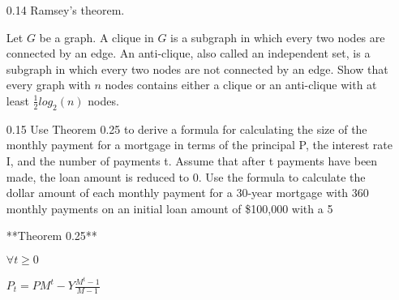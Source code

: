 \documentclass[12pt, a4paper]{article}
\begin{document}
\begin{enumerate}
\item[0.14]
Ramsey's theorem. 

Let $G$ be a graph. A clique in $G$ is a subgraph in which every two nodes are connected by an edge. An anti-clique, also called an independent set, is a subgraph in which every two nodes are not connected by an edge. Show that every graph with $n$ nodes contains either a clique or an anti-clique with at least $\frac{1}{2} log_2(n)$ nodes.


\item[0.15]
Use Theorem 0.25 to derive a formula for calculating the size of the monthly payment for a mortgage in terms of the principal P, the interest rate I, and the number of payments t. Assume that after t payments have been made, the loan amount is reduced to 0. Use the formula to calculate the dollar amount of each monthly payment for a 30-year mortgage with 360 monthly payments on an initial loan amount of \$100,000 with a 5%


**Theorem 0.25**

$\forall t \geq 0$


$P_t=PM^t-Y\frac{M^t-1}{M-1}$
\end{enumerate}
\end{document}
